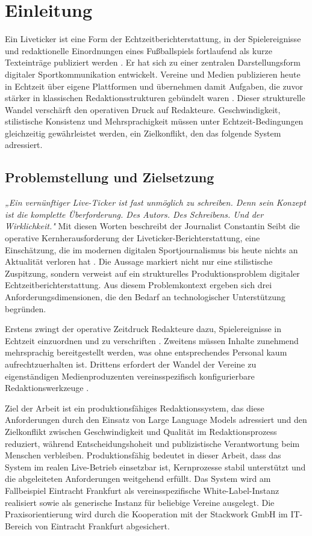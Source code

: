 \chapter{Einleitung}\label{einleitung}

Ein Liveticker ist eine Form der Echtzeitberichterstattung, in der Spielereignisse und redaktionelle Einordnungen eines Fußballspiels fortlaufend als kurze Texteinträge publiziert werden \cite{hauser2008, blum2023}. Er hat sich zu einer zentralen Darstellungsform digitaler Sportkommunikation entwickelt. Vereine und Medien publizieren heute in Echtzeit über eigene Plattformen und übernehmen damit Aufgaben, die zuvor stärker in klassischen Redaktionsstrukturen gebündelt waren \cite{beils2023}. Dieser strukturelle Wandel verschärft den operativen Druck auf Redakteure. Geschwindigkeit, stilistische Konsistenz und Mehrsprachigkeit müssen unter Echtzeit-Bedingungen gleichzeitig gewährleistet werden, ein Zielkonflikt, den das folgende System adressiert.

\section{Problemstellung und Zielsetzung}\label{problemstellung-und-zielsetzung}

\textit{„Ein vernünftiger Live-Ticker ist fast unmöglich zu schreiben. Denn sein Konzept ist die komplette Überforderung. Des Autors. Des Schreibens. Und der Wirklichkeit."} \cite{beils2023} Mit diesen Worten beschreibt der Journalist Constantin Seibt die operative Kernherausforderung der Liveticker-Berichterstattung, eine Einschätzung, die im modernen digitalen Sportjournalismus bis heute nichts an Aktualität verloren hat \cite{beils2023}. Die Aussage markiert nicht nur eine stilistische Zuspitzung, sondern verweist auf ein strukturelles Produktionsproblem digitaler Echtzeitberichterstattung. Aus diesem Problemkontext ergeben sich drei Anforderungsdimensionen, die den Bedarf an technologischer Unterstützung begründen.

Erstens zwingt der operative Zeitdruck Redakteure dazu, Spielereignisse in Echtzeit einzuordnen und zu verschriften \cite{hauser2008, blum2023}. Zweitens müssen Inhalte zunehmend mehrsprachig bereitgestellt werden, was ohne entsprechendes Personal kaum aufrechtzuerhalten ist. Drittens erfordert der Wandel der Vereine zu eigenständigen Medienproduzenten vereinsspezifisch konfigurierbare Redaktionswerkzeuge \cite{beils2023}.

Ziel der Arbeit ist ein produktionsfähiges Redaktionssystem, das diese Anforderungen durch den Einsatz von Large Language Models adressiert und den Zielkonflikt zwischen Geschwindigkeit und Qualität im Redaktionsprozess reduziert, während Entscheidungshoheit und publizistische Verantwortung beim Menschen verbleiben. Produktionsfähig bedeutet in dieser Arbeit, dass das System im realen Live-Betrieb einsetzbar ist, Kernprozesse stabil unterstützt und die abgeleiteten Anforderungen weitgehend erfüllt. Das System wird am Fallbeispiel Eintracht Frankfurt als vereinsspezifische White-Label-Instanz realisiert sowie als generische Instanz für beliebige Vereine ausgelegt. Die Praxisorientierung wird durch die Kooperation mit der Stackwork GmbH im IT-Bereich von Eintracht Frankfurt abgesichert.

